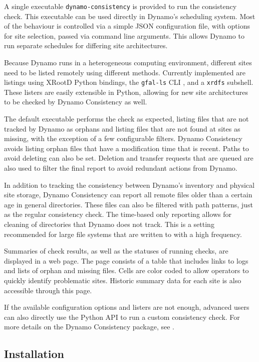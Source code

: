 A single executable \texttt{dynamo-consistency} is provided to run the consistency check.
This executable can be used directly in Dynamo’s scheduling system.
Most of the behaviour is controlled via a simple JSON configuration file,
with options for site selection, passed via command line arguments.
This allows Dynamo to run separate schedules for differing site architectures.

Because Dynamo runs in a heterogeneous computing environment,
different sites need to be listed remotely using different methods.
Currently implemented are listings using XRootD Python bindings,
the \texttt{gfal-ls} CLI \cite{laure2006programming}, and a \texttt{xrdfs} subshell.
These listers are easily extensible in Python,
allowing for new site architectures to be checked by Dynamo Consistency as well.

The default executable performs the check as expected,
listing files that are not tracked by Dynamo as orphans
and listing files that are not found at sites as missing,
with the exception of a few configurable filters.
Dynamo Consistency avoids listing orphan files that have a modification time that is recent.
Paths to avoid deleting can also be set.
Deletion and transfer requests that are queued are also used to filter the final report
to avoid redundant actions from Dynamo.

In addition to tracking the consistency between Dynamo’s inventory and physical site storage,
Dynamo Consistency can report all remote files older than a certain age
in general directories.
These files can also be filtered with path patterns, just as the regular consistency check.
The time-based only reporting allows for cleaning of directories that Dynamo does not track.
This is a setting recommended for large file systems
that are written to with a high frequency.

Summaries of check results, as well as the statuses of running checks,
are displayed in a web page.
The page consists of a table that includes links to logs and
lists of orphan and missing files.
Cells are color coded to allow operators to quickly identify problematic sites.
Historic summary data for each site is also accessible through this page.

If the available configuration options and listers are not enough,
advanced users can also directly use the Python API to run a custom consistency check.
For more details on the Dynamo Consistency package,
see \cite{dynamo_consistency}.

\subsection{Installation}

